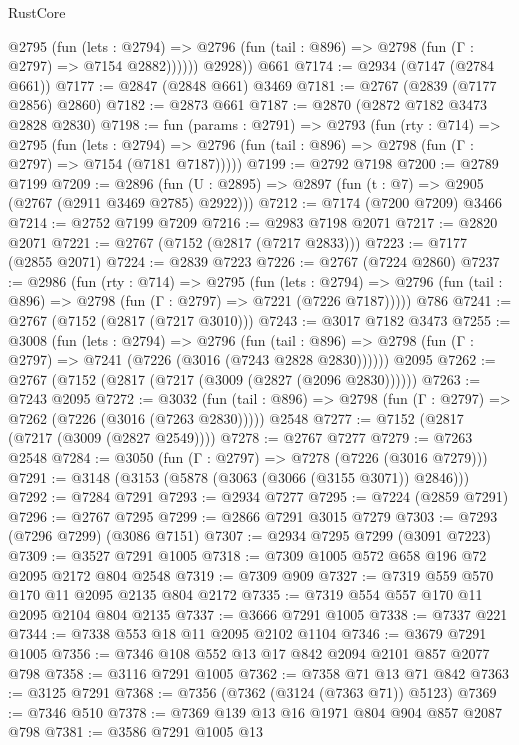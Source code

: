 \begin{lexlean}{RustCore}
\begin{coremodule}
            @2795
              (fun (lets : @2794) =>
              @2796 (fun (tail : @896) => @2798 (fun (Γ : @2797) => @7154 @2882))))))
        @2928))
    @661
@7174 := @2934 (@7147 (@2784 @661))
@7177 := @2847 (@2848 @661) @3469
@7181 := @2767 (@2839 (@7177 @2856) @2860)
@7182 := @2873 @661
@7187 := @2870 (@2872 @7182 @3473 @2828 @2830)
@7198 := fun (params : @2791) =>
  @2793
    (fun (rty : @714) =>
    @2795
      (fun (lets : @2794) =>
      @2796 (fun (tail : @896) => @2798 (fun (Γ : @2797) => @7154 (@7181 @7187)))))
@7199 := @2792 @7198
@7200 := @2789 @7199
@7209 := @2896 (fun (U : @2895) => @2897 (fun (t : @7) => @2905 (@2767 (@2911 @3469 @2785) @2922)))
@7212 := @7174 (@7200 @7209) @3466
@7214 := @2752 @7199 @7209
@7216 := @2983 @7198 @2071
@7217 := @2820 @2071
@7221 := @2767 (@7152 (@2817 (@7217 @2833)))
@7223 := @7177 (@2855 @2071)
@7224 := @2839 @7223
@7226 := @2767 (@7224 @2860)
@7237 := @2986
    (fun (rty : @714) =>
    @2795
      (fun (lets : @2794) =>
      @2796 (fun (tail : @896) => @2798 (fun (Γ : @2797) => @7221 (@7226 @7187)))))
    @786
@7241 := @2767 (@7152 (@2817 (@7217 @3010)))
@7243 := @3017 @7182 @3473
@7255 := @3008
    (fun (lets : @2794) =>
    @2796
      (fun (tail : @896) => @2798 (fun (Γ : @2797) => @7241 (@7226 (@3016 (@7243 @2828 @2830))))))
    @2095
@7262 := @2767 (@7152 (@2817 (@7217 (@3009 (@2827 (@2096 @2830))))))
@7263 := @7243 @2095
@7272 := @3032
    (fun (tail : @896) => @2798 (fun (Γ : @2797) => @7262 (@7226 (@3016 (@7263 @2830)))))
    @2548
@7277 := @7152 (@2817 (@7217 (@3009 (@2827 @2549))))
@7278 := @2767 @7277
@7279 := @7263 @2548
@7284 := @3050 (fun (Γ : @2797) => @7278 (@7226 (@3016 @7279)))
@7291 := @3148 (@3153 (@5878 (@3063 (@3066 (@3155 @3071)) @2846)))
@7292 := @7284 @7291
@7293 := @2934 @7277
@7295 := @7224 (@2859 @7291)
@7296 := @2767 @7295
@7299 := @2866 @7291 @3015 @7279
@7303 := @7293 (@7296 @7299) (@3086 @7151)
@7307 := @2934 @7295 @7299 (@3091 @7223)
@7309 := @3527 @7291 @1005
@7318 := @7309 @1005 @572 @658 @196 @72 @2095 @2172 @804 @2548
@7319 := @7309 @909
@7327 := @7319 @559 @570 @170 @11 @2095 @2135 @804 @2172
@7335 := @7319 @554 @557 @170 @11 @2095 @2104 @804 @2135
@7337 := @3666 @7291 @1005
@7338 := @7337 @221
@7344 := @7338 @553 @18 @11 @2095 @2102 @1104
@7346 := @3679 @7291 @1005
@7356 := @7346 @108 @552 @13 @17 @842 @2094 @2101 @857 @2077 @798
@7358 := @3116 @7291 @1005
@7362 := @7358 @71 @13 @71 @842
@7363 := @3125 @7291
@7368 := @7356 (@7362 (@3124 (@7363 @71)) @5123)
@7369 := @7346 @510
@7378 := @7369 @139 @13 @16 @1971 @804 @904 @857 @2087 @798
@7381 := @3586 @7291 @1005 @13

\end{coremodule}
\end{lexlean}
